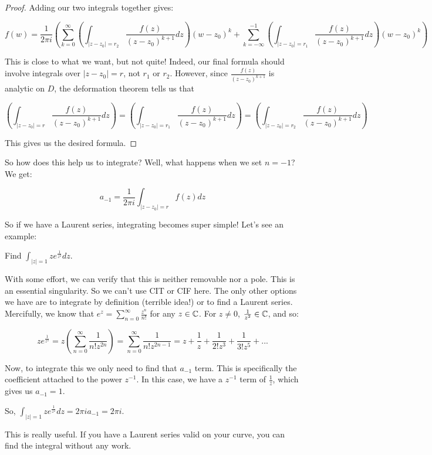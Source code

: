 \begin{proof}
Adding our two integrals together gives:

$$f(w) = \frac{1}{2\pi i} \left(\sum_{k = 0}^\infty \left(\int_{|z-z_0| = r_2} \frac{f(z)}{(z-z_0)^{k+1}}dz\right)(w-z_0)^k + \sum_{k = -\infty}^{-1} \left(\int_{|z-z_0| = r_1} \frac{f(z)}{(z-z_0)^{k+1}}dz\right)(w-z_0)^k\right)$$

This is close to what we want, but not quite! Indeed, our final formula should involve integrals over $|z-z_0| = r$, not $r_1$ or $r_2$. However, since $\frac{f(z)}{(z-z_0)^{k+1}}$ is analytic on $D$, the deformation theorem tells us that

$$\left(\int_{|z-z_0| = r} \frac{f(z)}{(z-z_0)^{k+1}}dz\right)=\left(\int_{|z-z_0| = r_1} \frac{f(z)}{(z-z_0)^{k+1}}dz\right)=\left(\int_{|z-z_0| = r_2} \frac{f(z)}{(z-z_0)^{k+1}}dz\right)$$

This gives us the desired formula.
\end{proof}

So how does this help us to integrate? Well, what happens when we set $n = -1$? We get:

$$a_{-1} = \frac{1}{2\pi i} \int_{|z-z_0| = r}f(z)dz$$

So if we have a Laurent series, integrating becomes super simple! Let's see an example:

\begin{ex}{}{} Find $\int_{|z| = 1} ze^{\frac{1}{z^2}}dz$.

With some effort, we can verify that this is neither removable nor a pole. This is an essential singularity. So we can't use CIT or CIF here. The only other options we have are to integrate by definition (terrible idea!) or to find a Laurent series. Mercifully, we know that $e^{z} = \sum_{n = 0}^\infty \frac{z^n}{n!}$ for any $z\in \mathbb{C}$. For $z\ne 0$, $\frac{1}{z^2}\in \mathbb{C}$, and so:

$$ze^{\frac{1}{z^2}} = z\left(\sum_{n = 0}^\infty \frac{1}{n!z^{2n}}\right) = \sum_{n = 0}^\infty \frac{1}{n!z^{2n-1}} = z + \frac{1}{z} + \frac{1}{2!z^3} + \frac{1}{3!z^5} + ...$$

Now, to integrate this we only need to find that $a_{-1}$ term. This is specifically the coefficient attached to the power $z^{-1}$. In this case, we have a $z^{-1}$ term of $\frac{1}{z}$, which gives us $a_{-1} = 1$.

So, $\int_{|z| = 1} ze^{\frac{1}{z^2}}dz = 2\pi i a_{-1} = 2\pi i$.

\end{ex}

This is really useful. If you have a Laurent series valid on your curve, you can find the integral without any work. 

